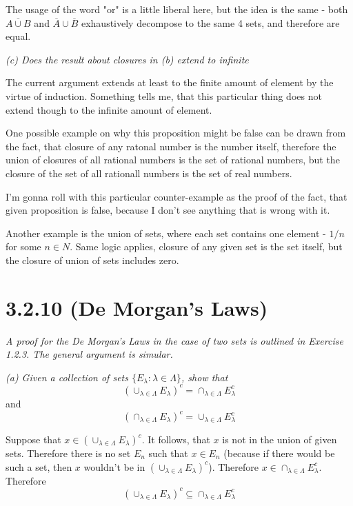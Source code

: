 \documentclass[11pt,oneside,titlepage]{article}
\begin{document}
The usage of the word "or" is a little liberal here, but the idea is the same - both
$\overline{A \cup B}$ and $\overline A \cup \overline B$ exhaustively decompose to the same
4 sets, and therefore are equal.

\textit{(c) Does the result about closures in (b) extend to infinite }

The current argument extends at least to the finite amount of element by the virtue of
induction. Something tells me, that this particular thing does not extend though to the
infinite amount of element.

One possible example on why this proposition might be false can be drawn
from the fact, that closure of any
ratonal number is the number itself, therefore the union of closures of all rational numbers is
the set of rational numbers, but the closure of the set of all rationall numbers is the
set of real numbers.

I'm gonna roll with this particular counter-example as the proof of the fact, that given
proposition is false, because I don't see anything that is wrong with it.

Another example  is the union of sets, where each set contains one element - $1/n$ for
some $n \in N$. Same logic applies, closure of any given set is the set itself, but
the closure of union of sets includes zero.


\section*{3.2.10 (De Morgan's Laws)}
\textit{A proof for the De Morgan's Laws in the case of two sets is outlined in Exercise 1.2.3.
  The general argument is simular.}

\textit{(a) Given a collection of sets $\{E_\lambda: \lambda \in  \Lambda\}$, show that }
$$\left(\cup_{\lambda \in \Lambda} E_\lambda \right)^c = \cap_{\lambda \in \Lambda} E_\lambda^c$$
and
$$\left(\cap_{\lambda \in \Lambda} E_\lambda \right)^c = \cup_{\lambda \in \Lambda} E_\lambda^c$$

Suppose that $x \in \left(\cup_{\lambda \in \Lambda} E_\lambda \right)^c$. It
follows, that $x$ is not in the union of given sets. Therefore there is no
set $E_n$ such that $x \in E_n$ (because if there would be such a set, then $x$
wouldn't be in $\left(\cup_{\lambda \in \Lambda} E_\lambda \right)^c$).
Therefore $x \in \cap_{\lambda \in \Lambda} E_\lambda^c$. Therefore 
$$\left(\cup_{\lambda \in \Lambda} E_\lambda \right)^c \subseteq \cap_{\lambda \in \Lambda} E_\lambda^c$$
\end{document}
